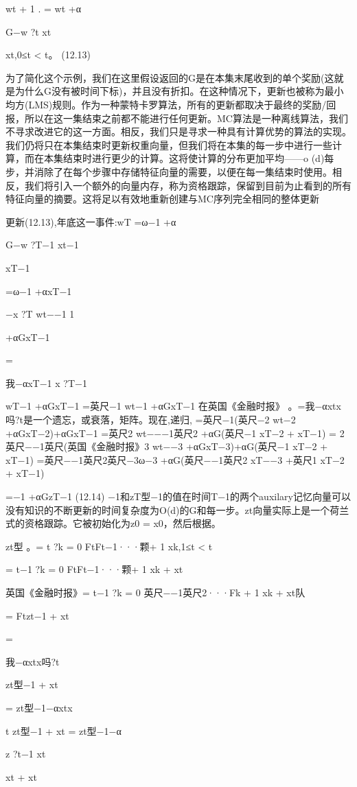 wt + 1
.
= wt +α

G−w ?t xt

xt,0≤t < t。 					(12.13)

为了简化这个示例，我们在这里假设返回的G是在本集末尾收到的单个奖励(这就是为什么G没有被时间下标)，并且没有折扣。在这种情况下，更新也被称为最小均方(LMS)规则。作为一种蒙特卡罗算法，所有的更新都取决于最终的奖励/回报，所以在这一集结束之前都不能进行任何更新。MC算法是一种离线算法，我们不寻求改进它的这一方面。相反，我们只是寻求一种具有计算优势的算法的实现。我们仍将只在本集结束时更新权重向量，但我们将在本集的每一步中进行一些计算，而在本集结束时进行更少的计算。这将使计算的分布更加平均——o (d)每步，并消除了在每个步骤中存储特征向量的需要，以便在每一集结束时使用。相反，我们将引入一个额外的向量内存，称为资格跟踪，保留到目前为止看到的所有特征向量的摘要。这将足以有效地重新创建与MC序列完全相同的整体更新

更新(12.13),年底这一事件:wT =ω−1 +α

G−w ?T−1 xt−1

xT−1

=ω−1 +αxT−1

−x ?T wt−−1 1

+αGxT−1

=

我−αxT−1 x ?T−1

wT−1 +αGxT−1
=英尺−1 wt−1 +αGxT−1
在英国《金融时报》
。=我−αxtx吗?t是一个遗忘，或衰落，矩阵。现在,递归,
=英尺−1(英尺−2 wt−2 +αGxT−2)+αGxT−1
=英尺2 wt−−−1英尺2 +αG(英尺−1 xT−2 + xT−1)
= 2英尺−−1英尺(英国《金融时报》3 wt−−3 +αGxT−3)+αG(英尺−1 xT−2 + xT−1)
=英尺−−1英尺2英尺−3ω−3 +αG(英尺−−1英尺2 xT−−3 +英尺1 xT−2 + xT−1)

=−1 +αGzT−1 					(12.14)
−1和zT型−1的值在时间T−1的两个auxilary记忆向量可以没有知识的不断更新的时间复杂度为O(d)的G和每一步。zt向量实际上是一个荷兰式的资格跟踪。它被初始化为z0 = x0，然后根据。


zt型
。=
t ?k = 0
FtFt−1···颗+ 1 xk,1≤t < t


=
t−1 ?k = 0
FtFt−1···颗+ 1 xk + xt


英国《金融时报》=
t−1 ?k = 0
英尺−−1英尺2···Fk + 1 xk + xt队

= Ftzt−1 + xt

=

我−αxtx吗?t

zt型−1 + xt

= zt型−1−αxtx

t zt型−1 + xt
= zt型−1−α

z ?t−1 xt

xt + xt

